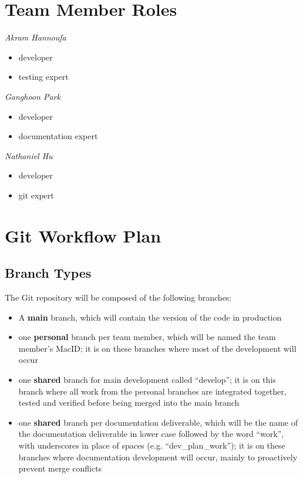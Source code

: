 \documentclass{article}
\begin{document}
\section{Team Member Roles}

\begin{itemize}
  \begin{item}
    \textit{Akram Hannoufa}
    \begin{itemize}
      \item developer
      \item testing expert
    \end{itemize}
  \end{item}

  \begin{item}
    \textit{Ganghoon Park}
    \begin{itemize}
      \item developer
      \item documentation expert
    \end{itemize}
  \end{item}

  \begin{item}
    \textit{Nathaniel Hu}
    \begin{itemize}
      \item developer
      \item git expert
    \end{itemize}
  \end{item}
\end{itemize}

\section{Git Workflow Plan}

\subsection{Branch Types}
The Git repository will be composed of the following branches:
\begin{itemize}
  \item A \textbf{main} branch, which will contain the version of the code in production
  \item one \textbf{personal} branch per team member, which will be named the team member's MacID; it is on these branches where most of the development will occur
  \item one \textbf{shared} branch for main development called “develop”; it is on this branch where all work from the personal branches are integrated together, tested and verified before being merged into the main branch
  \item one \textbf{shared} branch per documentation deliverable, which will be the name of the documentation deliverable in lower case followed by the word “work”, with underscores in place of spaces (e.g. “dev\_plan\_work”); it is on these branches where documentation development will occur, mainly to proactively prevent merge conflicts
\end{itemize}
\end{document}
